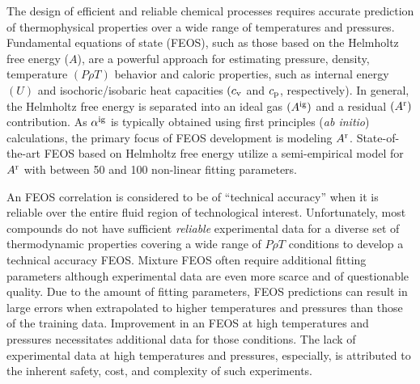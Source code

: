 \documentclass[11pt,a4paper]{article}
\begin{document}
The design of efficient and reliable chemical processes requires accurate prediction of thermophysical properties over a wide range of temperatures and pressures. Fundamental equations of state (FEOS), such as those based on the Helmholtz free energy ($A$), are a powerful approach for estimating pressure, density, temperature $(P\rho T)$ behavior and caloric properties, such as internal energy $(U)$ and isochoric/isobaric heat capacities $(c_{\rm v}$ and $c_{\rm p}$, respectively). In general, the Helmholtz free energy is separated into an ideal gas $(A^{\rm ig})$ and a residual $(A^{\rm r})$ contribution. As $\alpha^{\rm ig}$ is typically obtained using first principles (\textit{ab initio}) calculations, the primary focus of FEOS development is modeling $A^{\rm r}$. State-of-the-art FEOS based on Helmholtz free energy utilize a semi-empirical model for $A^{\rm r}$ with between 50 and 100 non-linear fitting parameters. 

An FEOS correlation is considered to be of ``technical accuracy'' when it is reliable over the entire fluid region of technological interest. Unfortunately, most compounds do not have sufficient \textit{reliable} experimental data for a diverse set of thermodynamic properties covering a wide range of $P \rho T$ conditions to develop a technical accuracy FEOS. Mixture FEOS often require additional fitting parameters although experimental data are even more scarce and of questionable quality. Due to the amount of fitting parameters, FEOS predictions can result in large errors when extrapolated to higher temperatures and pressures than those of the training data. Improvement in an FEOS at high temperatures and pressures necessitates additional data for those conditions. The lack of experimental data at high temperatures and pressures, especially, is attributed to the inherent safety, cost, and complexity of such experiments.
\end{document}
